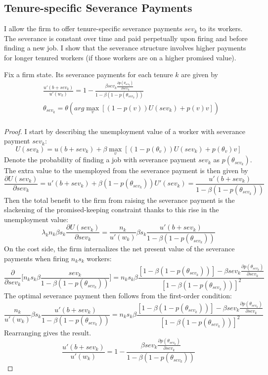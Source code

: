 \subsection{Tenure-specific Severance Payments} \label{severance}
I allow the firm to offer tenure-specific severance payments $sev_k$ to its workers. The severance is constant over time and paid perpetually upon firing and before finding a new job. I show that the severance structure involves higher payments for longer tenured workers (if those workers are on a higher promised value). 
\begin{proposition}
\label{severanceprop}
Fix a firm state. Its severance payments for each tenure $k$ are given by
\begin{equation*}
    \begin{split}
    & \frac{u'(b+sev_k)}{u'(w_k)}=1-\frac{\beta sev_k \frac{\partial p(\theta_{sev_k})}{\partial sev_k}}{1-\beta(1-p(\theta_{sev_k}))} \\
    & \theta_{sev_k} = \theta(arg \max_v [(1-p(v))U(sev_k)+p(v)v]) \\
    \end{split}
\end{equation*}
\end{proposition}
\begin{proof}
I start by describing the unemployment value of a worker with severance payment $sev_k$:
\[U(sev_k) = u(b+sev_k) + \beta \max_v[(1-p(\theta_v))U(sev_k)+p(\theta_v)v]\]
Denote the probability of finding a job with severance payment $sev_k$ as $p(\theta_{sev_k})$. The extra value to the unemployed from the severance payment is then given by
\[\frac{\partial U(sev_k)}{\partial sev_k} = u'(b+sev_k) + \beta (1-p(\theta_{sev_k}))U'(sev_k)=\frac{u'(b+sev_k)}{1-\beta(1-p(\theta_{sev_k}))}\]
Then the total benefit to the firm from raising the severance payment is the slackening of the promised-keeping constraint thanks to this rise in the unemployment value:
\[\lambda_k n_k \beta s_k \frac{\partial U(sev_k)}{\partial sev_k} = \frac{n_k}{u'(w_k)}\beta s_k \frac{u'(b+sev_k)}{1-\beta(1-p(\theta_{sev_k}))}\]
On the cost side, the firm internalizes the net present value of the severance payments when firing $n_ks_k$ workers:
\[\frac{\partial}{\partial sev_k}\Big[n_k s_k \beta \frac{sev_k}{1-\beta(1-p(\theta_{sev_k}))}\Big]=n_ks_k\beta \frac{[1-\beta(1-p(\theta_{sev_k}))]-\beta sev_k \frac{\partial p(\theta_{sev_k})}{\partial sev_k}}{[1-\beta(1-p(\theta_{sev_k}))]^2}\]
The optimal severance payment then follows from the first-order condition:
\[ \frac{n_k}{u'(w_k)}\beta s_k \frac{u'(b+sev_k)}{1-\beta(1-p(\theta_{sev_k}))} = n_ks_k\beta \frac{[1-\beta(1-p(\theta_{sev_k}))]-\beta sev_k \frac{\partial p(\theta_{sev_k})}{\partial sev_k}}{[1-\beta(1-p(\theta_{sev_k}))]^2}\]
Rearranging gives the result.
\[\frac{u'(b+sev_k)}{u'(w_k)}=1-\frac{\beta sev_k \frac{\partial p(\theta_{sev_k})}{\partial sev_k}}{1-\beta(1-p(\theta_{sev_k}))}\]
\end{proof}
